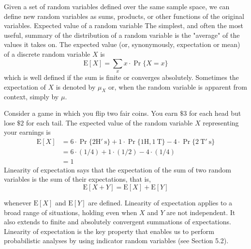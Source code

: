 \documentclass[lang=cn,newtx,10pt,scheme=chinese]{elegantbook}
\begin{document}
Given a set of random variables defined over the same sample space, we can define new random variables as sums, products, or other functions of the original variables.
Expected value of a random variable
The simplest, and often the most useful, summary of the distribution of a random variable is the "average" of the values it takes on. The expected value (or, synonymously, expectation or mean) of a discrete random variable $X$ is
$$
\mathrm{E}[X]=\sum_x x \cdot \operatorname{Pr}\{X=x\}
$$
which is well defined if the sum is finite or converges absolutely. Sometimes the expectation of $X$ is denoted by $\mu_X$ or, when the random variable is apparent from context, simply by $\mu$.

Consider a game in which you flip two fair coins. You earn $\$ 3$ for each head but lose $\$ 2$ for each tail. The expected value of the random variable $X$ representing your earnings is
$$
\begin{aligned}
\mathrm{E}[X] & =6 \cdot \operatorname{Pr}\{2 \mathrm{H} ' \mathrm{~s}\}+1 \cdot \operatorname{Pr}\{1 \mathrm{H}, 1 \mathrm{~T}\}-4 \cdot \operatorname{Pr}\{2 \mathrm{~T} ' \mathrm{~s}\} \\
& =6 \cdot(1 / 4)+1 \cdot(1 / 2)-4 \cdot(1 / 4) \\
& =1
\end{aligned}
$$
Linearity of expectation says that the expectation of the sum of two random variables is the sum of their expectations, that is,
$$
\mathrm{E}[X+Y]=\mathrm{E}[X]+\mathrm{E}[Y]
$$

whenever $\mathrm{E}[X]$ and $\mathrm{E}[Y]$ are defined. Linearity of expectation applies to a broad range of situations, holding even when $X$ and $Y$ are not independent. It also extends to finite and absolutely convergent summations of expectations. Linearity of expectation is the key property that enables us to perform probabilistic analyses by using indicator random variables (see Section 5.2).
\end{document}
